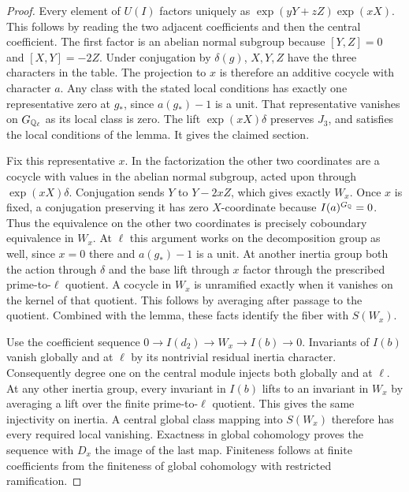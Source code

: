 \documentclass[a4paper,11pt]{article}
\theoremstyle{definition}
\theoremstyle{remark}
\numberwithin{equation}{section}
\begin{document}
\begin{proof}
Every element of \(U(I)\) factors uniquely as
\(\exp(yY+zZ)\exp(xX)\). This follows by reading the two
adjacent coefficients and then the central coefficient. The
first factor is an abelian normal subgroup because \([Y,Z]=0\)
and \([X,Y]=-2Z\). Under conjugation by \(\delta(g)\), \(X,Y,Z\)
have the three characters in the table. The projection to \(x\)
is therefore an additive cocycle with character \(a\).
Any class with the stated local conditions has exactly one
representative zero at \(g_*\), since \(a(g_*)-1\) is a unit.
That representative vanishes on \(G_{\mathbb Q_\ell}\) as its local
class is zero. The lift \(\exp(xX)\delta\) preserves \(J_3\),
and satisfies the local conditions of the lemma. It gives the
claimed section.

Fix this representative \(x\). In the factorization the other
two coordinates are a cocycle with values in the abelian normal
subgroup, acted upon through \(\exp(xX)\delta\). Conjugation sends
\(Y\) to \(Y-2xZ\), which gives exactly \(W_x\). Once \(x\)
is fixed, a conjugation preserving it has zero \(X\)-coordinate
because \(I(a)^{G_\mathbb Q}=0\). Thus the equivalence on the other
two coordinates is precisely coboundary equivalence in \(W_x\).
At \(\ell\) this argument works on the decomposition group
as well, since \(x=0\) there and \(a(g_*)-1\) is a unit.
At another inertia group both the action through \(\delta\) and
the base lift through \(x\) factor through the prescribed
prime-to-\(\ell\) quotient. A cocycle in \(W_x\) is unramified
exactly when it vanishes on the kernel of that quotient. This
follows by averaging after passage to the quotient. Combined
with the lemma, these facts identify the fiber with \(S(W_x)\).

Use the coefficient sequence \(0\to I(d_2)\to W_x\to I(b)\to0\).
Invariants of \(I(b)\) vanish globally and at \(\ell\) by its
nontrivial residual inertia character. Consequently degree one
on the central module injects both globally and at \(\ell\).
At any other inertia group, every invariant in \(I(b)\) lifts
to an invariant in \(W_x\) by averaging a lift over the finite
prime-to-\(\ell\) quotient. This gives the same injectivity
on inertia. A central global class mapping into \(S(W_x)\)
therefore has every required local vanishing. Exactness in
global cohomology proves the sequence with \(D_x\) the image
of the last map. Finiteness follows at finite coefficients
from the finiteness of global cohomology with restricted
ramification.


\end{proof}
\end{document}
